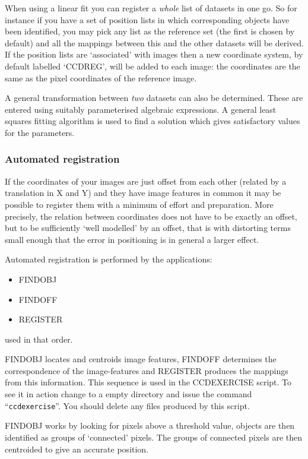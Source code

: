 \documentclass[twoside,11pt]{article}
\newcommand{\htmlref}[2]{#1}
\newcommand{\xlabel}[1]{}
\renewcommand{\_}{\texttt{\symbol{95}}}
\newcommand{\text}[1]{{\small \tt #1}}
\newcommand{\routine}[1]{{\sc #1}}
\newcommand{\xroutine}[1]{\htmlref{{\sc #1}}{#1}}
\begin{document}
When using a linear fit you can register a {\em whole\/} list of datasets
in one go. So for instance if you have a set of position lists in which
corresponding objects have been identified, you may pick any list as the
reference set (the first is chosen by default) and all the mappings between
this and the other datasets will be derived. 
If the position lists are `associated' with images then a new 
coordinate system, 
by default labelled `CCD\_REG', will be added to each image:
the coordinates are the same as 
the pixel coordinates of the reference image.

A general transformation between {\em two\/} datasets can also be
determined. These are entered using suitably parameterised algebraic
expressions. A general least squares fitting algorithm is used to find
a solution which gives satisfactory values for the parameters.



\subsubsection{\xlabel{automatedregistration}Automated registration}

If the coordinates of your images are just offset from each other 
(related by a translation in X and Y)
and they have image features in
common it may be possible to register them with a minimum of effort and
preparation.
More precisely, the relation between coordinates does not have to
be exactly an offset, but to be
sufficiently `well modelled' by an offset, that is
with distorting terms small enough that the error in
positioning is in general a larger effect.

Automated registration is performed by the applications:
\begin{itemize}
\item \xroutine{FINDOBJ}
\item \xroutine{FINDOFF}
\item \xroutine{REGISTER}
\end{itemize}
used in that order.

\routine{FINDOBJ} locates and centroids image features,
\routine{FINDOFF} determines the
correspondence of the image-features and \routine{REGISTER} produces the
mappings from this information. This sequence is used in the
CCDEXERCISE script. To see it in action change to a empty directory and
issue the command ``\text{ccdexercise}''. You should delete any
files produced by this script.

\routine{FINDOBJ} works by looking for pixels above a threshold value, 
objects are
then identified as groups of `connected' pixels. The groups of connected
pixels are then centroided to give an accurate position.
\end{document}

